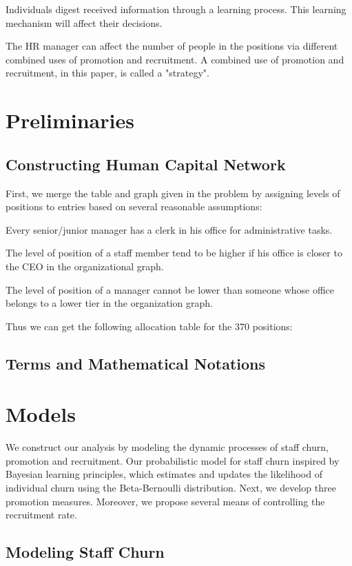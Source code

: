 \documentclass[10pt]{article}
\begin{document}
  Individuals digest received information through a learning process. This learning mechanism will affect their decisions.

  The HR manager can affect the number of people in the positions via different combined uses of promotion and recruitment. A combined use of promotion and recruitment, in this paper, is called a "strategy".

  \section{Preliminaries}
  \subsection{Constructing Human Capital Network}

  First, we merge the table and graph given in the problem by assigning levels of positions to entries based on several reasonable assumptions:

  Every senior/junior manager has a clerk in his office for administrative tasks.

  The level of position of a staff member tend to be higher if his office is closer to the CEO in the organizational graph.

  The level of position of a manager cannot be lower than someone whose office belongs to a lower tier in the organization graph.

  Thus we can get the following allocation table for the 370 positions:


  \subsection{Terms and Mathematical Notations}
  \section{Models}

  We construct our analysis by modeling the dynamic processes of staff churn, promotion and recruitment. Our probabilistic model for staff churn inspired by Bayesian learning principles, which estimates and updates the likelihood of individual churn using the Beta-Bernoulli distribution. Next, we develop three promotion measures. Moreover, we propose several means of controlling the recruitment rate.

  \subsection{Modeling Staff Churn}
\end{document}
